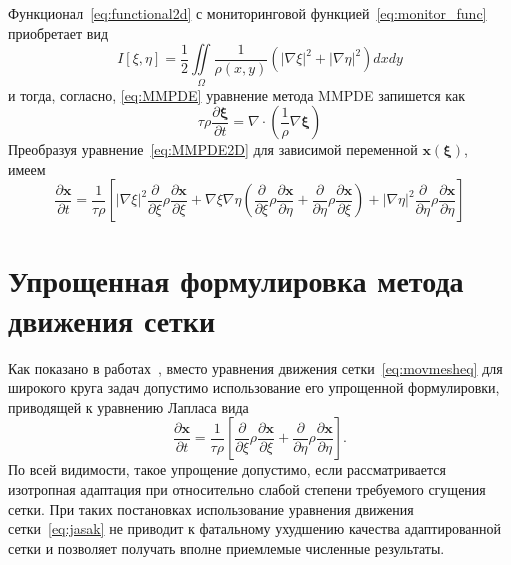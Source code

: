 Функционал~\eqref{eq:functional2d} с мониторинговой функцией~\eqref{eq:monitor_func} приобретает вид 
\begin{equation}
I[\xi,\eta] = \frac{1}{2}\iint\limits_{\Omega}\frac{1}{\rho(x,y)}\left(|\nabla \xi|^2+|\nabla \eta|^2\right)dxdy
\label{eq:2Dfunctional}
\end{equation}
и тогда, согласно, \eqref{eq:MMPDE} уравнение метода MMPDE запишется как 
\begin{equation}
\tau \rho\frac{\partial \boldsymbol\xi}{\partial t} = \nabla\cdot\left(\frac{1}{\rho}\nabla \boldsymbol\xi \right)
\label{eq:MMPDE2D}
\end{equation}
Преобразуя уравнение~\eqref{eq:MMPDE2D} для зависимой переменной  $\mathbf{x}( \boldsymbol\xi)$, имеем~\cite{huang_practical_2001}
\begin{equation}\label{eq:movmesheq}
\frac{\partial \mathbf{x}}{\partial t} = \frac{1}{\tau \rho} 
\left[
|\nabla \xi|^2 \frac{\partial }{\partial \xi}\rho \frac{\partial \mathbf{x}}{\partial \xi} +
\nabla \xi \nabla\eta \left( \frac{\partial }{\partial \xi}\rho \frac{\partial \mathbf{x}}{\partial \eta} +\frac{\partial }{\partial \eta}\rho \frac{\partial \mathbf{x}}{\partial \xi} \right) +
|\nabla \eta|^2 \frac{\partial }{\partial \eta}\rho \frac{\partial \mathbf{x}}{\partial \eta}
\right]
\end{equation}

\section{Упрощенная формулировка метода движения сетки}
Как показано в работах~\cite{jasak_automatic_2006, tukovic_moving_2012}, вместо уравнения движения сетки~\eqref{eq:movmesheq} для широкого круга задач допустимо использование его упрощенной формулировки, приводящей к уравнению Лапласа вида
\begin{equation}\label{eq:jasak}
\frac{\partial \mathbf{x}}{\partial t} = \frac{1}{\tau \rho} 
\left[
 \frac{\partial }{\partial \xi}\rho \frac{\partial \mathbf{x}}{\partial \xi} +
 \frac{\partial }{\partial \eta}\rho \frac{\partial \mathbf{x}}{\partial \eta}
\right].
\end{equation}
По всей видимости, такое упрощение допустимо, если рассматривается изотропная адаптация при относительно слабой степени требуемого сгущения сетки. При таких постановках использование уравнения движения сетки~\eqref{eq:jasak} не приводит к фатальному ухудшению качества адаптированной сетки и позволяет получать вполне приемлемые численные результаты. 


